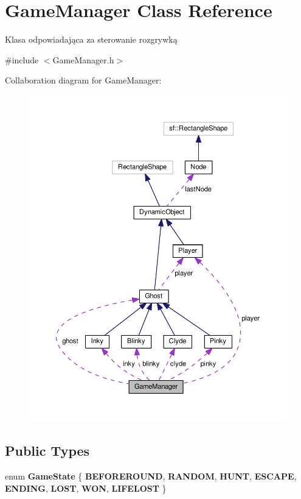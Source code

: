 \hypertarget{classGameManager}{}\section{Game\+Manager Class Reference}
\label{classGameManager}


Klasa odpowiadająca za sterowanie rozgrywką  




{\ttfamily \#include $<$Game\+Manager.\+h$>$}



Collaboration diagram for Game\+Manager\+:\nopagebreak
\begin{figure}[H]
\begin{center}
\leavevmode
\includegraphics[width=350pt]{classGameManager__coll__graph}
\end{center}
\end{figure}
\subsection*{Public Types}
\begin{DoxyCompactItemize}
\item 
\mbox{\label{classGameManager_a809dec58b5681fc1ebcc22eb428a914c}} 
enum {\bfseries Game\+State} \{ \newline
{\bfseries B\+E\+F\+O\+R\+E\+R\+O\+U\+ND}, 
{\bfseries R\+A\+N\+D\+OM}, 
{\bfseries H\+U\+NT}, 
{\bfseries E\+S\+C\+A\+PE}, 
\newline
{\bfseries E\+N\+D\+I\+NG}, 
{\bfseries L\+O\+ST}, 
{\bfseries W\+ON}, 
{\bfseries L\+I\+F\+E\+L\+O\+ST}
 \}
\end{DoxyCompactItemize}
